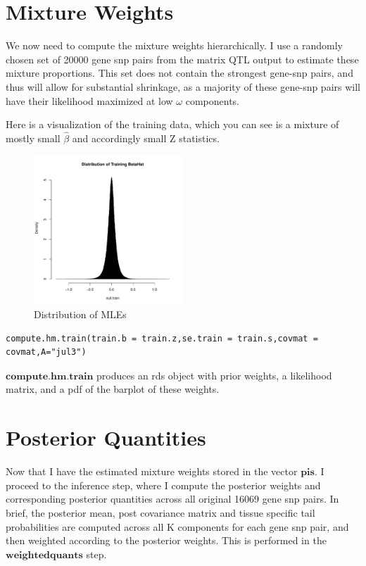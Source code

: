 \documentclass[10pt]{article}
\begin{document}
\begin{itemize}
\section{Mixture Weights}
We now need to compute the mixture weights hierarchically. I use  a randomly chosen set of 20000 gene snp pairs from the matrix QTL output to estimate these mixture proportions. This set does not contain the strongest gene-snp pairs, and thus will allow for substantial shrinkage, as a majority of these gene-snp pairs will  have their likelihood maximized at low $\omega$ components.

Here is a visualization of the training data, which you can see is a mixture of mostly small $\hat{\beta}$ and accordingly small Z statistics.

\begin{figure}[h!]
  \caption{Distribution of MLEs}
  \centering
    \includegraphics[width=0.5\textwidth]{../Figures/distributionofbhattrain.pdf}
\end{figure}

\begin{verbatim}
compute.hm.train(train.b = train.z,se.train = train.s,covmat = covmat,A="jul3")
\end{verbatim}

$\textbf{compute.hm.train}$ produces an rds object with prior weights, a likelihood matrix, and a pdf of the barplot of these weights.

\section{Posterior Quantities}
Now that I have the estimated mixture weights stored in the vector $\textbf{pis}$. I proceed to the inference step, where I compute the posterior weights and corresponding posterior quantities across all original 16069 gene snp pairs. In brief, the posterior mean, post covariance matrix and tissue specific tail probabilities are computed across all K components for each gene snp pair, and then weighted according to the posterior weights. This is performed in the $\textbf{weightedquants}$ step.



\end{itemize}
\end{document}
